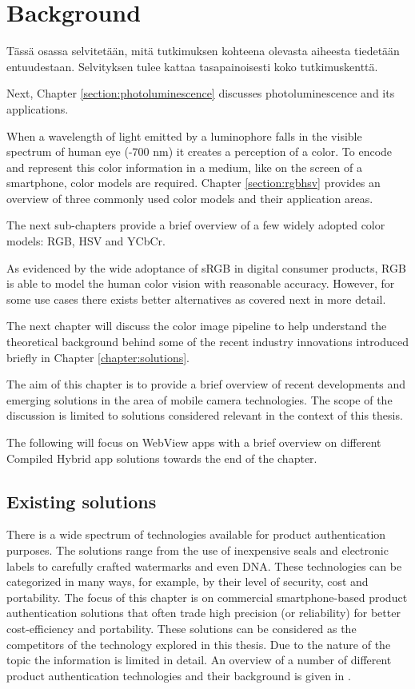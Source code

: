 \documentclass[thesis.tex]{subfiles}
\begin{document}
\chapter{Background}
\label{chapter:background}

Tässä osassa selvitetään, mitä tutkimuksen kohteena olevasta aiheesta tiedetään entuudestaan. Selvityksen tulee kattaa tasapainoisesti koko tutkimuskenttä.

Next, Chapter \ref{section:photoluminescence} discusses photoluminescence and its applications.

When a wavelength of light emitted by a luminophore falls in the visible spectrum of human eye (-700 nm) it creates a perception of a color. To encode and represent this color information in a medium, like on the screen of a smartphone, color models are required. Chapter \ref{section:rgbhsv} provides an overview of three commonly used color models and their application areas.

The next sub-chapters provide a brief overview of a few widely adopted color models: RGB, HSV and YCbCr.

As evidenced by the wide adoptance of sRGB in digital consumer products, RGB is able to model the human color vision with reasonable accuracy. However, for some use cases there exists better alternatives as covered next in more detail.

The next chapter will discuss the color image pipeline to help understand the theoretical background behind some of the recent industry innovations introduced briefly in Chapter \ref{chapter:solutions}.

The aim of this chapter is to provide a brief overview of recent developments and emerging solutions in the area of mobile camera technologies. The scope of the discussion is limited to solutions considered relevant in the context of this thesis.

The following will focus on WebView apps with a brief overview on different Compiled Hybrid app solutions towards the end of the chapter.
\clearpage

\section{Existing solutions}

There is a wide spectrum of technologies available for product authentication purposes. The solutions range from the use of inexpensive seals and electronic labels to carefully crafted watermarks and even DNA. These technologies can be categorized in many ways, for example, by their level of security, cost and portability. The focus of this chapter is on commercial smartphone-based product authentication solutions that often trade high precision (or reliability) for better cost-efficiency and portability. These solutions can be considered as the competitors of the technology explored in this thesis. Due to the nature of the topic the information is limited in detail. An overview of a number of different product authentication technologies and their background is given in \cite{kuosmanen}.
\end{document}
